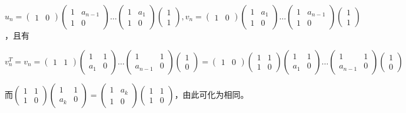 \documentclass[a4paper,UTF8,fontset=windows]{ctexart}
\begin{document}
\begin{enumerate}
$u_n=\begin{pmatrix}1&0\end{pmatrix}\begin{pmatrix}1&a_{n-1}\\1&0\end{pmatrix}\dots\begin{pmatrix}1&a_1\\1&0\end{pmatrix}\begin{pmatrix}1\\1\end{pmatrix},v_n=\begin{pmatrix}1&0\end{pmatrix}\begin{pmatrix}1&a_1\\1&0\end{pmatrix}\dots\begin{pmatrix}1&a_{n-1}\\1&0\end{pmatrix}\begin{pmatrix}1\\1\end{pmatrix}$，且有

$v_n^T=v_n=\begin{pmatrix}1&1\end{pmatrix}\begin{pmatrix}1&1\\a_1&0\end{pmatrix}\dots\begin{pmatrix}1&1\\a_{n-1}&0\end{pmatrix}\begin{pmatrix}1\\0\end{pmatrix}=\begin{pmatrix}1&0\end{pmatrix}\begin{pmatrix}1&1\\1&0\end{pmatrix}\begin{pmatrix}1&1\\a_1&0\end{pmatrix}\dots\begin{pmatrix}1&1\\a_{n-1}&0\end{pmatrix}\begin{pmatrix}1\\0\end{pmatrix}$

而$\begin{pmatrix}1&1\\1&0\end{pmatrix}\begin{pmatrix}1&1\\a_k&0\end{pmatrix}=\begin{pmatrix}1&a_k\\1&0\end{pmatrix}\begin{pmatrix}1&1\\1&0\end{pmatrix}$，由此可化为相同。
\end{enumerate}
\end{document}

